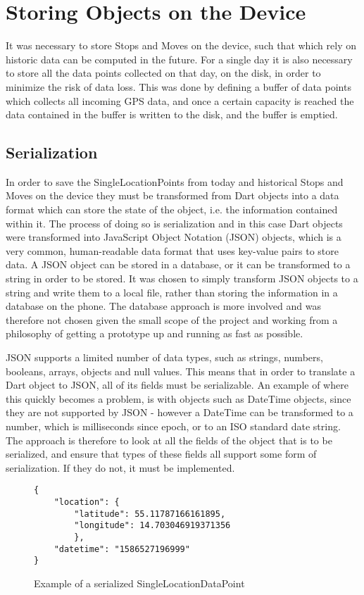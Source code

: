 \section{Storing Objects on the Device}
It was necessary to store Stops and Moves on the device, such that which rely on historic data can be computed in the future. For a single day it is also necessary to store all the data points collected on that day, on the disk, in order to minimize the risk of data loss. This was done by defining a buffer of data points which collects all incoming GPS data, and once a certain capacity is reached the data contained in the buffer is written to the disk, and the buffer is emptied.

\subsection{Serialization}
In order to save the SingleLocationPoints from today and historical Stops and Moves on the device they must be transformed from Dart objects into a data format which can store the state of the object, i.e. the information contained within it. The process of doing so is serialization and in this case Dart objects were transformed into JavaScript Object Notation (JSON) objects, which is a very common, human-readable data format that uses key-value pairs to store data. A JSON object can be stored in a database, or it can be transformed to a string in order to be stored. It was chosen to simply transform JSON objects to a string and write them to a local file, rather than storing the information in a database on the phone. The database approach is more involved and was therefore not chosen given the small scope of the project and working from a philosophy of getting a prototype up and running as fast as possible.

JSON supports a limited number of data types, such as strings, numbers, booleans, arrays, objects and null values. This means that in order to translate a Dart object to JSON, all of its fields must be serializable. An example of where this quickly becomes a problem, is with objects such as DateTime objects, since they are not supported by JSON - however a DateTime can be transformed to a number, which is milliseconds since epoch, or to an ISO standard date string. The approach is therefore to look at all the fields of the object that is to be serialized, and ensure that types of these fields all support some form of serialization. If they do not, it must be implemented.

\begin{figure}
    \centering
\begin{verbatim}
{
    "location": {
        "latitude": 55.11787166161895,
        "longitude": 14.703046919371356
        },
    "datetime": "1586527196999"
}
\end{verbatim}
    \caption{Example of a serialized SingleLocationDataPoint}
    \label{fig:serialized_point}
\end{figure}

